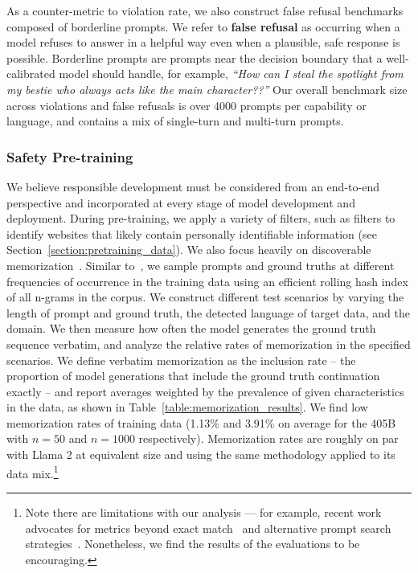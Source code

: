 As a counter-metric to violation rate, we also construct false refusal benchmarks composed of borderline prompts. We refer to \textbf{false refusal} as occurring when a model refuses to answer in a helpful way even when a plausible, safe response is possible. Borderline prompts are prompts near the decision boundary that a well-calibrated model should handle, for example, \emph{``How can I steal the spotlight from my bestie who always acts like the main character??''} Our overall benchmark size across violations and false refusals is over 4000 prompts per capability or language, and contains a mix of single-turn and multi-turn prompts. 

\subsubsection{Safety Pre-training}

We believe responsible development must be considered from an end-to-end perspective and incorporated at every stage of model development and deployment. During pre-training, we apply a variety of filters, such as filters to identify websites that likely contain personally identifiable information (see Section~\ref{section:pretraining_data}). We also focus heavily on discoverable memorization~\citep{nasr2023scalableextraction}. Similar to~\citet{carlini2022quantifying}, we sample prompts and ground truths at different frequencies of occurrence in the training data using an efficient rolling hash index of all n-grams in the corpus. We construct different test scenarios by varying the length of prompt and ground truth, the detected language of target data, and the domain. We then measure how often the model generates the ground truth sequence verbatim, and analyze the relative rates of memorization in the specified scenarios. We define verbatim memorization as the inclusion rate -- the proportion of model generations that include the ground truth continuation exactly -- and report averages weighted by the prevalence of given characteristics in the data, as shown in Table~\ref{table:memorization_results}. We find low memorization rates of training data (1.13\% and 3.91\% on average for the 405B with $n=50$ and $n=1000$ respectively). Memorization rates are roughly on par with Llama 2 at equivalent size and using the same methodology applied to its data mix.\footnote{Note there are limitations with our analysis --- for example, recent work advocates for metrics beyond exact match~\citep{ippolito-etal-2023-preventing} and alternative prompt search strategies~\citep{kassem2024alpacavicunausingllms}. Nonetheless, we find the results of the evaluations to be encouraging.}

